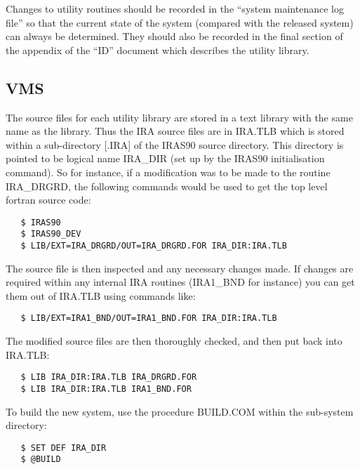 Changes to utility routines should be recorded in the ``system maintenance log
file'' so that the current state of the system (compared with the released
system) can always be determined. They should also be recorded in the final
section of the appendix of the ``{\small ID}'' document which describes the
utility library. 

\subsection{VMS}
The source files for each utility library are stored in a text library with the
same name as the library. Thus the {\small IRA} source files are in {\small
IRA.TLB} which is stored within a sub-directory {\small [.IRA]} of the {\small
IRAS90} source directory. This directory is pointed to be logical name {\small
IRA\_DIR} (set up by the {\small IRAS90} initialisation command). So for
instance, if a modification was to be made to the routine {\small IRA\_DRGRD},
the following commands would be used to get the top level fortran source code: 

\small
\begin{verbatim}
   $ IRAS90
   $ IRAS90_DEV
   $ LIB/EXT=IRA_DRGRD/OUT=IRA_DRGRD.FOR IRA_DIR:IRA.TLB
\end{verbatim}
\normalsize

The source file is then inspected and any necessary changes made. If changes are
required within any internal {\small IRA} routines ({\small IRA1\_BND} for
instance) you can get them out of {\small IRA.TLB} using commands like: 

\small
\begin{verbatim}
   $ LIB/EXT=IRA1_BND/OUT=IRA1_BND.FOR IRA_DIR:IRA.TLB
\end{verbatim}
\normalsize

The modified source files are then thoroughly checked, and then put back into
{\small IRA.TLB}: 

\small
\begin{verbatim}
   $ LIB IRA_DIR:IRA.TLB IRA_DRGRD.FOR
   $ LIB IRA_DIR:IRA.TLB IRA1_BND.FOR
\end{verbatim}
\normalsize

To build the new system, use the procedure {\small BUILD.COM} within the 
sub-system directory:

\small
\begin{verbatim}
   $ SET DEF IRA_DIR
   $ @BUILD
\end{verbatim}
\normalsize

